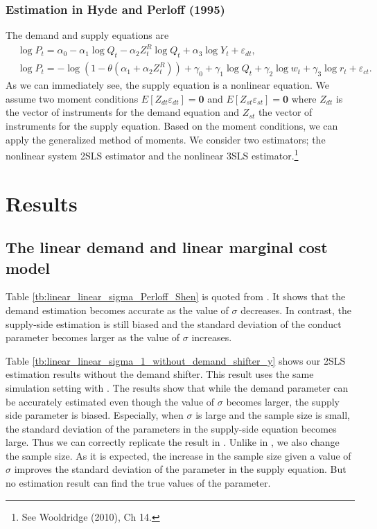 \documentclass[11pt, a4paper]{article}
\begin{document}
\subsubsection{Estimation in Hyde and Perloff (1995)}
The demand and supply equations are
\begin{align}
    &\log P_{t} = \alpha_0 - \alpha_1 \log Q_t - \alpha_2 Z^R_t\log Q_t + \alpha_3 \log Y_t + \varepsilon_{dt},\\
    &\log P_t  = - \log(1 - \theta(\alpha_1 + \alpha_2 Z^R_t)) + \gamma_0 + \gamma_1 \log Q_t +  \gamma_2 \log w_t + \gamma_3 \log r_t + \varepsilon_{ct}.
\end{align}
As we can immediately see, the supply equation is a nonlinear equation.
We assume two moment conditions $E[Z_{dt} \varepsilon_{dt}] = \bm0 $ and $ E[Z_{st} \varepsilon_{st}] =\bm0$ where $Z_{dt}$ is the vector of instruments for the demand equation and $Z_{st}$ the vector of instruments for the supply equation.
Based on the moment conditions, we can apply the generalized method of moments.
We consider two estimators; the nonlinear system 2SLS estimator and the nonlinear 3SLS estimator.\footnote{See Wooldridge (2010), Ch 14.}



\section{Results}


\subsection{The linear demand and linear marginal cost model}
Table \ref{tb:linear_linear_sigma_Perloff_Shen} is quoted from \cite{perloff2012collinearity}.
It shows that the demand estimation becomes accurate as the value of $\sigma$ decreases.
In contrast, the supply-side estimation is still biased and the standard deviation of the conduct parameter becomes larger as the value of $\sigma$ increases.

Table \ref{tb:linear_linear_sigma_1_without_demand_shifter_y} shows our 2SLS estimation results without the demand shifter. 
This result uses the same simulation setting with \citet{perloff2012collinearity}.
The results show that while the demand parameter can be accurately estimated even though the value of $\sigma$ becomes larger, the supply side parameter is biased.
Especially, when $\sigma$ is large and the sample size is small, the standard deviation of the parameters in the supply-side equation becomes large.
Thus we can correctly replicate the result in \citet{perloff2012collinearity}.
Unlike in \cite{perloff2012collinearity}, we also change the sample size.
As it is expected, the increase in the sample size given a value of $\sigma$ improves the standard deviation of the parameter in the supply equation. 
But no estimation result can find the true values of the parameter.
\end{document}
